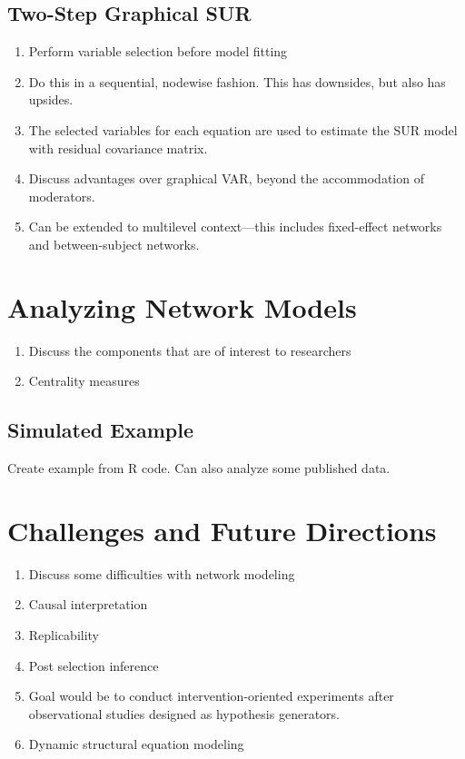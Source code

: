 \subsection{Two-Step Graphical SUR}
\begin{enumerate}
    \item Perform variable selection before model fitting
    \item Do this in a sequential, nodewise fashion. This has downsides, but also has upsides.
    \item The selected variables for each equation are used to estimate the SUR model with residual covariance matrix.
    \item Discuss advantages over graphical VAR, beyond the accommodation of moderators.
    \item Can be extended to multilevel context---this includes fixed-effect networks and between-subject networks.
\end{enumerate}

\section{Analyzing Network Models}
\begin{enumerate}
    \item Discuss the components that are of interest to researchers
    \item Centrality measures
\end{enumerate}
\subsection{Simulated Example}
Create example from R code. Can also analyze some published data.

\section{Challenges and Future Directions}
\begin{enumerate}
    \item Discuss some difficulties with network modeling
    \item Causal interpretation
    \item Replicability
    \item Post selection inference
    \item Goal would be to conduct intervention-oriented experiments after observational studies designed as hypothesis generators.
    \item Dynamic structural equation modeling
\end{enumerate}
